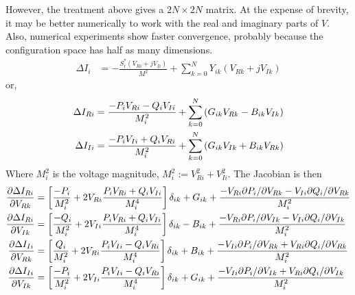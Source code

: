 \documentclass[11pt]{article}
\begin{document}
However, the treatment above gives a $2N \times 2N$ matrix. At the expense of brevity, it may be better numerically to work with the real and imaginary parts of $V$. Also, numerical experiments show faster convergence, probably because the configuration space has half as many dimensions.
\begin{align}
\Delta I_i &= -\frac{S^*_i\left(V_{Ri}+jV_{Ii}\right)}{M^2} + \sum_{k=0}^NY_{ik}\left(V_{Rk} + j V_{Ik}\right)
\end{align}
or,
\begin{align}
\Delta I_{Ri} &= \frac{-P_iV_{Ri}-Q_iV_{Ii}}{M^2_i} + \sum_{k=0}^N\left(G_{ik}V_{Rk} - B_{ik}V_{Ik}\right)\notag \\
\Delta I_{Ii} &= \frac{-P_iV_{Ii}+Q_iV_{Ri}}{M^2_i} + \sum_{k=0}^N\left(G_{ik}V_{Ik} + B_{ik}V_{Rk}\right)
\end{align}
Where $M^2_i$ is the voltage magnitude, $M^2_i := V_{Ri}^2 + V_{Ii}^2$. The Jacobian is then
\begin{align}
\frac{\partial \Delta I_{Ri}}{\partial V_{Rk}} &= \left[\frac{-P_i}{M^2_i} + 2V_{Ri}\frac{P_iV_{Ri} + Q_iV_{Ii}}{M^4_i}\right]\delta_{ik}+G_{ik} 
+\frac{-V_{Ri}\partial P_i/\partial V_{Rk}-V_{Ii}\partial Q_i/\partial V_{Rk}}{M^2_i}\notag \\
\frac{\partial \Delta I_{Ri}}{\partial V_{Ik}} &= \left[\frac{-Q_i}{M^2_i} + 2V_{Ii}\frac{P_iV_{Ri} + Q_iV_{Ii}}{M^4_i}\right]\delta_{ik}-B_{ik}
+\frac{-V_{Ri}\partial P_i/\partial V_{Ik}-V_{Ii}\partial Q_i/\partial V_{Ik}}{M^2_i}\notag \\
\frac{\partial \Delta I_{Ii}}{\partial V_{Rk}} &= \left[\frac{Q_i}{M^2_i} + 2V_{Ri}\frac{P_iV_{Ii} - Q_iV_{Ri}}{M^4_i}\right]\delta_{ik}+B_{ik}
+\frac{-V_{Ii}\partial P_i/\partial V_{Rk}+V_{Ri}\partial Q_i/\partial V_{Rk}}{M^2_i} \notag \\
\frac{\partial \Delta I_{Ii}}{\partial V_{Ik}} &= \left[\frac{-P_i}{M^2_i} + 2V_{Ii}\frac{P_iV_{Ii} - Q_iV_{Ri}}{M^4_i}\right]\delta_{ik}+G_{ik}
+\frac{-V_{Ii}\partial P_i/\partial V_{Ik}+V_{Ri}\partial Q_i/\partial V_{Ik}}{M^2_i}
\end{align}
\end{document}
